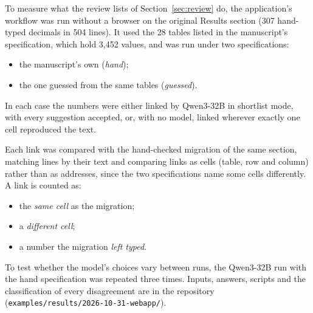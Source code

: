 To measure what the review lists of Section~\ref{sec:review} do, the application's workflow was
run without a browser on the original Results section (307 hand-typed decimals in 504 lines). It
used the 28 tables listed in the manuscript's specification, which hold 3,452 values, and was run
under two specifications:
\begin{itemize}
\item the manuscript's own (\emph{hand});
\item the one \pv{} guessed from the same tables (\emph{guessed}).
\end{itemize}
In each case the numbers were either linked by Qwen3-32B in shortlist mode, with every suggestion
accepted, or, with no model, linked wherever exactly one cell reproduced the text.

Each link was compared with the hand-checked migration of the same section, matching lines by
their text and comparing links as cells (table, row and column) rather than as addresses, since
the two specifications name some cells differently. A link is counted as:
\begin{itemize}
\item the \emph{same cell} as the migration;
\item a \emph{different cell};
\item a number the migration \emph{left typed}.
\end{itemize}
To test whether the model's choices vary between runs, the Qwen3-32B run with the hand
specification was repeated three times. Inputs, answers, scripts and the classification of every
disagreement are in the repository (\texttt{examples/results/2026-10-31-webapp/}).
